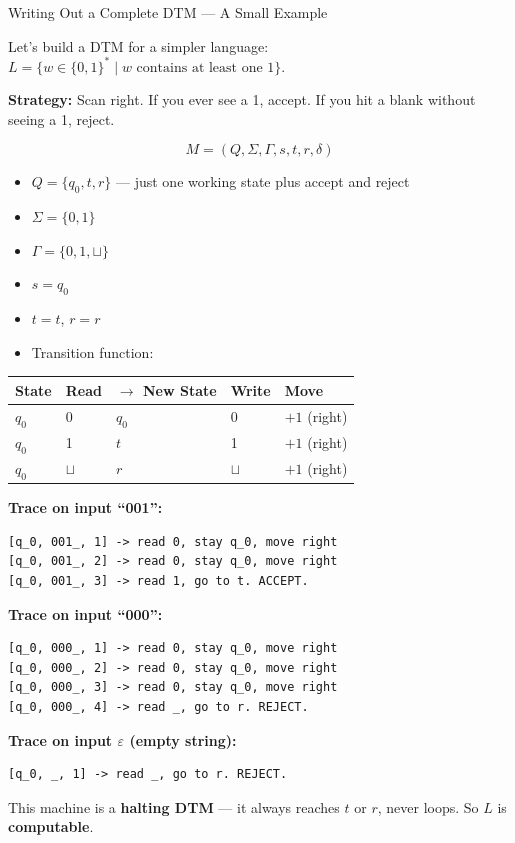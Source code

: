 \documentclass[11pt,a4paper]{article}
\begin{document}
\begin{examplebox}{Writing Out a Complete DTM --- A Small Example}

Let's build a DTM for a simpler language: $L = \{w \in \{0,1\}^* \mid w \text{ contains at least one } 1\}$.

\textbf{Strategy:} Scan right. If you ever see a 1, accept. If you hit a blank without seeing a 1, reject.

$$M = (Q, \Sigma, \Gamma, s, t, r, \delta)$$
\begin{itemize}[nosep]
\item $Q = \{q_0, t, r\}$ --- just one working state plus accept and reject
\item $\Sigma = \{0, 1\}$
\item $\Gamma = \{0, 1, \sqcup\}$
\item $s = q_0$
\item $t = t$, $r = r$
\item Transition function:
\end{itemize}

\begin{center}
\begin{tabular}{lllll}
\toprule
State & Read & $\to$ New State & Write & Move \\
\midrule
$q_0$ & 0 & $q_0$ & 0 & $+1$ (right) \\
$q_0$ & 1 & $t$ & 1 & $+1$ (right) \\
$q_0$ & $\sqcup$ & $r$ & $\sqcup$ & $+1$ (right) \\
\bottomrule
\end{tabular}
\end{center}

\textbf{Trace on input ``001'':}
\begin{lstlisting}
[q_0, 001_, 1] -> read 0, stay q_0, move right
[q_0, 001_, 2] -> read 0, stay q_0, move right
[q_0, 001_, 3] -> read 1, go to t. ACCEPT.
\end{lstlisting}

\textbf{Trace on input ``000'':}
\begin{lstlisting}
[q_0, 000_, 1] -> read 0, stay q_0, move right
[q_0, 000_, 2] -> read 0, stay q_0, move right
[q_0, 000_, 3] -> read 0, stay q_0, move right
[q_0, 000_, 4] -> read _, go to r. REJECT.
\end{lstlisting}

\textbf{Trace on input $\varepsilon$ (empty string):}
\begin{lstlisting}
[q_0, _, 1] -> read _, go to r. REJECT.
\end{lstlisting}

This machine is a \textbf{halting DTM} --- it always reaches $t$ or $r$, never loops. So $L$ is \textbf{computable}.
\end{examplebox}
\end{document}
